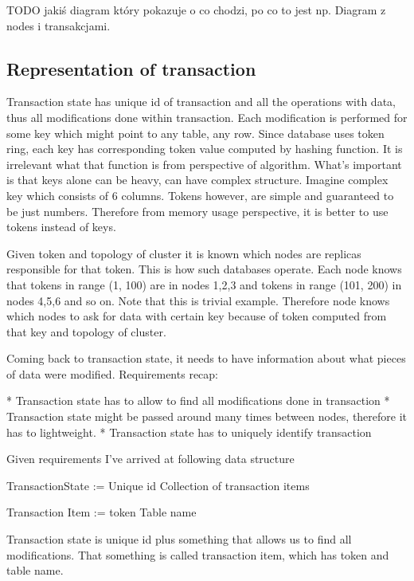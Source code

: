 

TODO jakiś diagram który pokazuje o co chodzi, po co to jest np. Diagram z nodes i transakcjami.


\subsection{Representation of transaction}
Transaction state has unique id of transaction and all the operations with data, thus all modifications done within transaction. Each modification is performed for some key which might point to any table, any row. Since database uses token ring, each key has corresponding token value computed by hashing function. It is irrelevant what that function is from perspective of algorithm. What’s important is that keys alone can be heavy, can have complex structure. Imagine complex key which consists of 6 columns. Tokens however, are simple and guaranteed to be just numbers. Therefore from memory usage perspective, it is better to use tokens instead of keys.


Given token and topology of cluster it is known which nodes are replicas responsible for that token. This is how such databases operate. Each node knows that tokens in range (1, 100) are in nodes 1,2,3 and tokens in range (101, 200) in nodes 4,5,6 and so on. Note that this is trivial example.
Therefore node knows which nodes to ask for data with certain key because of token computed from that key and topology of cluster.


Coming back to transaction state, it needs to have information about what pieces of data were modified. Requirements recap:


* Transaction state has to allow to find all modifications done in transaction
* Transaction state might be passed around many times between nodes, therefore it has to lightweight.
* Transaction state has to uniquely identify transaction


Given requirements I’ve arrived at following data structure


TransactionState :=
        Unique id
        Collection of transaction items 


Transaction Item :=
        token
        Table name

Transaction state is unique id plus something that allows us to find all modifications. That something is called transaction item, which has token and table name. 


